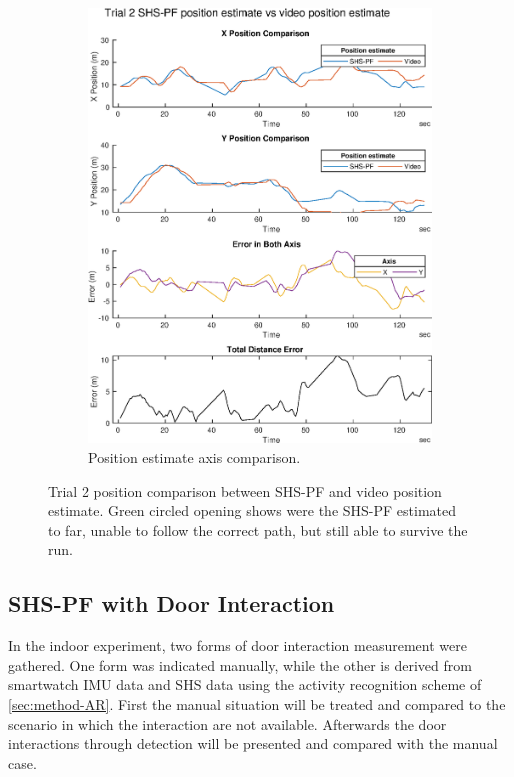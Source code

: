 \begin{figure}[H]
\begin{subfigure}[t]{.45\textwidth}
		\includegraphics[width=\linewidth]{images/20201129_1904_trial_2_traj_1}
		\caption{Position estimate axis comparison.}
		\label{fig:shspf_trial2_comparison}
	\end{subfigure}
	\setlength{\belowcaptionskip}{-20pt}
	\caption{Trial 2 position comparison between SHS-PF and video position estimate. Green circled opening shows were the SHS-PF estimated to far, unable to follow the correct path, but still able to survive the run.}
	\label{fig:shspf_trial2_shs_gt_comparison}
\end{figure}

\subsection{SHS-PF with Door Interaction}
In the indoor experiment, two forms of door interaction measurement were gathered. One form was indicated manually, while the other is derived from smartwatch \ac{IMU} data and \ac{SHS} data using the activity recognition scheme of \cref{sec:method-AR}.  First the manual situation will be treated and compared to the scenario in which the interaction are not available. Afterwards the door interactions through detection will be presented and compared with the manual case.\par


